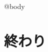 \documentclass[uplatex, tate, book, oneside, paper={6.4in,3.6in}, fontsize=14pt, number_of_lines=18, line_length=2.8in, open_bracket_pos=nibu_tentsuki, hanging_punctuation]{jlreq}
\date{}
\begin{document}
\showoutput
\maketitle
@{body}
\chapter{終わり}
\end{document}
